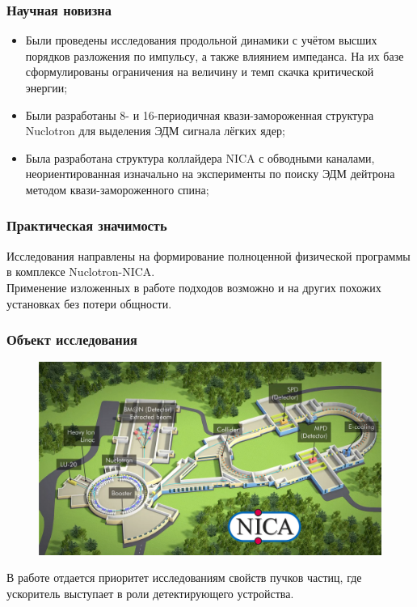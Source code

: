 \begin{frame}
	\frametitle{Научная новизна}
	\begin{itemize}
		\item 	Были проведены исследования продольной динамики с учётом высших порядков разложения по импульсу, а также влиянием импеданса. На их базе сформулированы ограничения на величину и темп скачка критической энергии;
		\vspace{1em}
		\item	Были разработаны 8- и 16-периодичная квази-замороженная структура Nuclotron для выделения ЭДМ сигнала лёгких ядер;
		\vspace{1em}
		\item	Была разработана структура коллайдера NICA с обводными каналами, неориентированная изначально на эксперименты по поиску ЭДМ дейтрона методом квази-замороженного спина;
	\end{itemize}
\end{frame}
\begin{frame}
	\frametitle{Практическая значимость}
	Исследования направлены на формирование полноценной физической программы в комплексе Nuclotron-NICA. \\
	Применение изложенных в работе подходов возможно и на других похожих установках без потери общности.
\end{frame}
\begin{frame}
	\frametitle{Объект исследования}
	\begin{figure}
		\centering
		\includegraphics[width=0.6\linewidth]{images/NICA}
	\end{figure}
	В работе отдается приоритет исследованиям свойств пучков частиц, где ускоритель выступает в роли детектирующего устройства.
\end{frame}
